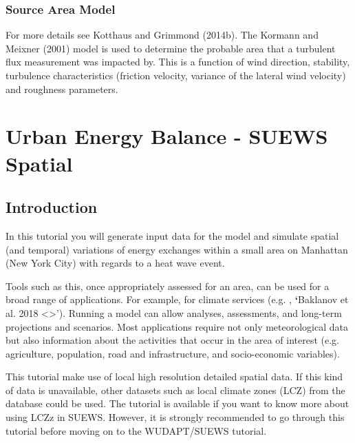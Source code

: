 \documentclass[letterpaper,10pt,english]{sphinxmanual}
\begin{document}
\subsubsection{Source Area Model}
\label{\detokenize{Tutorials/SuewsAdvanced:source-area-model}}
For more details see Kotthaus and Grimmond (2014b). The Kormann and
Meixner (2001) model is used to determine the probable area that a
turbulent flux measurement was impacted by. This is a function of wind
direction, stability, turbulence characteristics (friction velocity,
variance of the lateral wind velocity) and roughness parameters.


\section{Urban Energy Balance - SUEWS Spatial}
\label{\detokenize{Tutorials/SuewsSpatial:urban-energy-balance-suews-spatial}}\label{\detokenize{Tutorials/SuewsSpatial:suewsspatial}}\label{\detokenize{Tutorials/SuewsSpatial::doc}}

\subsection{Introduction}
\label{\detokenize{Tutorials/SuewsSpatial:introduction}}
In this tutorial you will generate input data for the
 model and simulate spatial
(and temporal) variations of energy exchanges within a small area on Manhattan
(New York City) with regards to a heat wave event.

Tools such as this, once appropriately assessed for an area, can be used
for a broad range of applications. For example, for climate services
(e.g.  , {\color{red}\bfseries{}{}`}Baklanov et al. 2018 \textless{}\textgreater{}’). Running a model can allow analyses,
assessments, and long-term projections and scenarios. Most applications
require not only meteorological data but also information about the
activities that occur in the area of interest (e.g. agriculture,
population, road and infrastructure, and socio-economic variables).

This tutorial make use of local high resolution detailed spatial data. If this kind of data is unavailable, other datasets such as local climate zones (LCZ) from the  database could be used. The tutorial {\hyperref[\detokenize{Tutorials/SuewsWUDAPT:suewswudapt}]{}} is available if you want to know more about using LCZz in SUEWS. However, it is strongly recommended to go through this tutorial before moving on to the WUDAPT/SUEWS tutorial.
\end{document}
